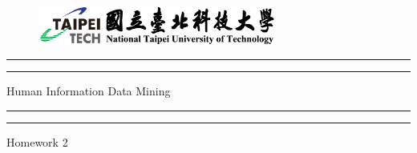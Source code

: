 \begin{titlepage} %

	\centering %
	
	\scshape %
	
	\vspace*{\baselineskip} %

	\begin{figure}

        \centering

        \includegraphics[width=0.7\textwidth]{../output/logo}

    \end{figure}
	
	
	\rule{\textwidth}{1.6pt}\vspace*{-\baselineskip}\vspace*{2pt} %
	\rule{\textwidth}{0.4pt} %
	
	\vspace{0.75\baselineskip} %
	
	{\LARGE Human Information Data Mining} %
	
	\vspace{0.75\baselineskip} %
	
	\rule{\textwidth}{0.4pt}\vspace*{-\baselineskip}\vspace{3.2pt} %
	\rule{\textwidth}{1.6pt} %
	
	\vspace{2\baselineskip} %
	
	
	Homework 2 %
	
	\vspace*{3\baselineskip} %
	

\end{titlepage}
